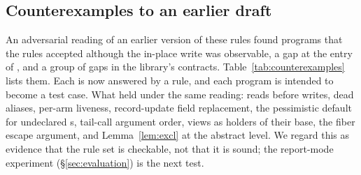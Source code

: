\subsection{Counterexamples to an earlier draft}
\label{sec:soundness-counterexamples}

An adversarial reading of an earlier version of these rules found programs that the rules accepted
although the in-place write was observable, a gap at the entry of , and a group of
gaps in the library's contracts. Table~\ref{tab:counterexamples} lists them. Each is now answered by
a rule, and each program is intended to become a test case. What held under the same reading: reads before writes,
dead aliases, per-arm liveness, record-update field replacement, the pessimistic default for
undeclared s, tail-call argument order, views as holders of their base, the fiber escape
argument, and Lemma~\ref{lem:excl} at the abstract level. We regard this as evidence that the rule set
is checkable, not that it is sound; the report-mode experiment (\S\ref{sec:evaluation}) is the next
test.

